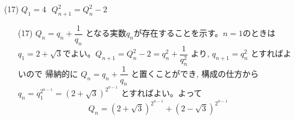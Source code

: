 (17) $Q_1=4$\,\, $Q_{n+1}^2 =Q_n^2-2$
\enthm
\begin{enumerate}
\item[(17)] $Q_n=q_n+\dfrac{1}{q_n}$ となる実数$q_n$が存在することを示す。$n=1$のときは $q_1=2+\sqrt{3}$でよい。$Q_{n+1}=Q_n^2-2= q_n^2+\dfrac{1}{q_n^2}$ より, $q_{n+1}=q_n^2$ とすればよいので 帰納的に $Q_n=q_n+\dfrac{1}{q_n}$ と置くことができ, 構成の仕方から $q_n=q_1^{2^{n-1}}=(2+\sqrt{3})^{2^{n-1}}$ とすればよい。よって
\[Q_n= (2+\sqrt{3})^{2^{n-1}}+ (2-\sqrt{3})^{2^{n-1}}\]
\end{enumerate}
